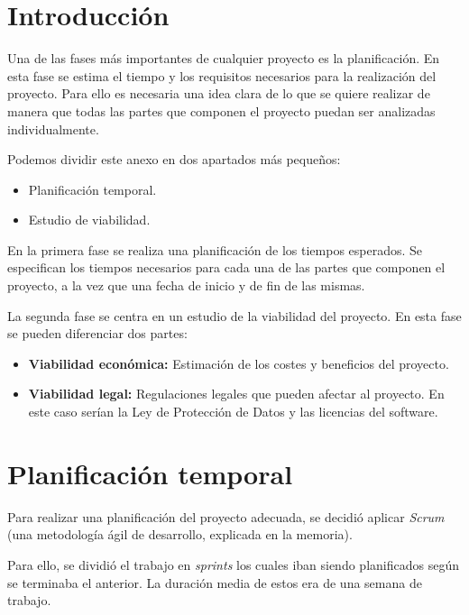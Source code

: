 
\section{Introducción}

Una de las fases más importantes de cualquier proyecto es la planificación. En esta fase se estima el tiempo y los requisitos necesarios para la realización del proyecto. Para ello es necesaria una idea clara de lo que se quiere realizar de manera que todas las partes que componen el proyecto puedan ser analizadas individualmente.

Podemos dividir este anexo en dos apartados más pequeños:

\begin{itemize}
\item
  Planificación temporal.
\item
  Estudio de viabilidad.
\end{itemize}

En la primera fase se realiza una planificación de los tiempos esperados. Se especifican los tiempos necesarios para cada una de las partes que componen el proyecto, a la vez que una fecha de inicio y de fin de las mismas.

La segunda fase se centra en un estudio de la viabilidad del proyecto. En esta fase se pueden diferenciar dos partes:

\begin{itemize}
\item
\textbf{Viabilidad económica:} Estimación de los costes y beneficios del proyecto.
\item
\textbf{Viabilidad legal:} Regulaciones legales que pueden afectar al proyecto. En este caso serían la Ley de Protección de Datos y las licencias del software.
\end{itemize}

\section{Planificación temporal}

Para realizar una planificación del proyecto adecuada, se decidió aplicar \emph{Scrum} (una metodología ágil de desarrollo, explicada en la memoria).

Para ello, se dividió el trabajo en \emph{sprints} los cuales iban siendo planificados según se terminaba el anterior. La duración media de estos era de una semana de trabajo.

